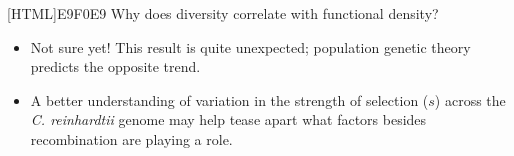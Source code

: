 \documentclass[a0paper,portrait]{baposter}
\newcommand{\compresslist}{%
\setlength{\itemsep}{0pt}%
\setlength{\parskip}{1pt}%
\setlength{\parsep}{0pt}%
}
\begin{document}
\begin{poster}
{[HTML]{E9F0E9}{
Why does diversity correlate with functional density?
}
\begin{itemize}\compresslist
	\item Not sure yet! This result is quite unexpected; population genetic theory predicts the opposite trend.
    \item A better understanding of variation in the strength of selection ($s$) across the \textit{C. reinhardtii} genome may help tease apart what factors besides recombination are playing a role. 
    \it
\end{itemize}
}



\end{poster}
\end{document}
